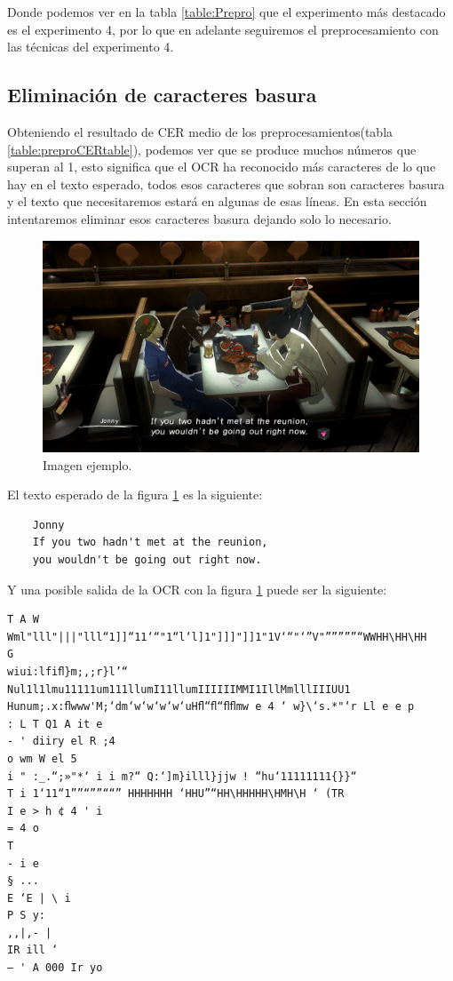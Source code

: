Donde podemos ver en la tabla \ref{table:Prepro} que el experimento más destacado es el experimento 4, por lo que en adelante seguiremos el preprocesamiento con las técnicas del experimento 4.
\subsection{Eliminación de caracteres basura}
\label{subsec:Eliminación de caracter basura}
Obteniendo el resultado de CER medio de los preprocesamientos(tabla \ref{table:preproCERtable}), podemos ver que se produce muchos números que superan al 1, esto significa que el OCR ha reconocido más caracteres de lo que hay en el texto esperado, todos esos caracteres que sobran son caracteres basura y el texto que necesitaremos estará en algunas de esas líneas. En esta sección intentaremos eliminar esos caracteres basura dejando solo lo necesario.
\begin{figure}[H]
	\centering
	\includegraphics[width = 1\textwidth]{Imagenes/Sample_Trash_Char.png}
	\caption{Imagen ejemplo.}
	\label{fig:Trash_Char}
\end{figure}

El texto esperado de la figura \ref{fig:Trash_Char} es la siguiente:
\begin{verbatim}
	Jonny
	If you two hadn't met at the reunion,
	you wouldn't be going out right now.
\end{verbatim}
Y una posible salida de la OCR con la figura \ref{fig:Trash_Char} puede ser la siguiente:
\begin{verbatim}
T A W
Wml"lll"|||"lll“1]]“11‘“"1“l‘l]1"]]]"]]1"1V‘“"‘”V"”””””“WWHH\HH\HH
G
wiui:lfiﬂ}m;,;r}l’“
Nul1l1lmu11111um111llumI11llumIIIIIIMMI1IllMmlllIIIUU1
Hunum;.x:ﬂwww'M;‘dm‘w‘w‘w‘w‘uHﬂ“ﬂ“ﬂﬂmw e 4 ‘ w}\‘s.*"‘r Ll e e p
: L T Q1 A it e
- ' diiry el R ;4
o wm W el 5
i " :_.“;»"*‘ i i m?“ Q:‘]m}illl}jjw ! “hu‘11111111{}}“
T i 1‘11“1””“””““” HHHHHHH ‘HHU”“HH\HHHHH\HMH\H ‘ (TR
I e > h ¢ 4 ' i
= 4 o
T
- i e
§ ...
E ‘E | \ i
P S y:
,,|,- |
IR ill ‘
— ' A 000 Ir yo
\end{verbatim}

